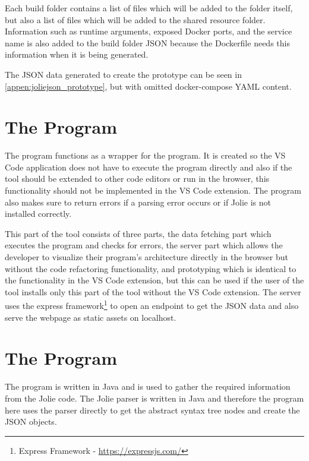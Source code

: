 Each build folder contains a list of files which will be added to the folder itself, but also a list of files which will be added to the shared resource folder.
Information such as runtime arguments, exposed Docker ports, and the service name is also added to the build folder JSON because the Dockerfile needs this information when it is being generated.

The JSON data generated to create the prototype can be seen in \cref{appen:joliejson_prototype}, but with omitted docker-compose YAML content.

\section{The \nodetoolname[] Program}
The \nodetoolname[] program functions as a wrapper for the \javatoolname[] program. It is created so the VS Code application does not have to execute the \javatoolname[] program directly and also if the tool should be extended to other code editors or run in the browser, this functionality should not be implemented in the VS Code extension.
The \nodetoolname[] program also makes sure to return errors if a parsing error occurs or if Jolie is not installed correctly.

This part of the tool consists of three parts, the data fetching part which executes the \javatoolname[] program and checks for errors, the server part which allows the developer to visualize their program's architecture directly in the browser but without the code refactoring functionality, and
prototyping which is identical to the functionality in the VS Code extension, but this can be used if the user of the tool installs only this part of the tool without the VS Code extension.
The server uses the express framework\footnote{Express Framework - \url{https://expressjs.com/}} to open an endpoint to get the JSON data and also serve the webpage as static assets on localhost.

\section{The \javatoolname[] Program}
The \javatoolname[] program is written in Java and is used to gather the required information from the Jolie code. The Jolie parser is written in Java and therefore the \javatoolname[] program here uses the parser directly to get the abstract syntax tree nodes and create the JSON objects.

